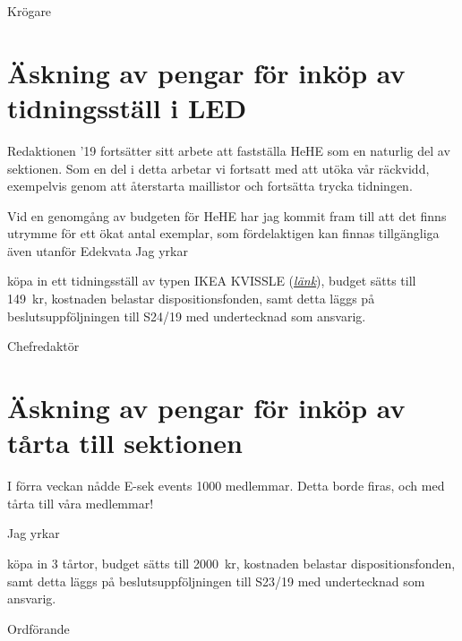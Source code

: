 \documentclass[10pt]{article}
\begin{document}
    \begin{signatures}{1}
    \textit{\ist}
    \signature{Davida Åström}{Krögare}
    \end{signatures}




\newpage

    \section*{Äskning av pengar för inköp av tidningsställ i LED}
    
 	Redaktionen '19 fortsätter sitt arbete att fastställa HeHE som en naturlig del av sektionen. Som en del i detta arbetar vi fortsatt med att utöka vår räckvidd, exempelvis genom att återstarta maillistor och fortsätta trycka tidningen.

Vid en genomgång av budgeten för HeHE har jag kommit fram till att det finns utrymme för ett ökat antal exemplar, som fördelaktigen kan finnas tillgängliga även utanför Edekvata
Jag yrkar 


    \begin{attsatser}
        \att köpa in ett tidningsställ av typen IKEA KVISSLE (\href{https://www.ikea.com/se/sv/p/kvissle-tidningsstaell-foer-vaegg-vit-90198030/}{\textit{länk}}),
        \att budget sätts till \SI{149}{kr},
        \att kostnaden belastar dispositionsfonden, samt
        \att detta läggs på beslutsuppföljningen till S24/19 med undertecknad som ansvarig. 
    \end{attsatser}

    \begin{signatures}{1}
    \textit{\mvh}
    \signature{Emil Eriksson}{Chefredaktör}
    \end{signatures}

\newpage

\section*{Äskning av pengar för inköp av tårta till sektionen}
    
 	I förra veckan nådde E-sek events 1000 medlemmar. Detta borde firas, och med tårta till våra medlemmar!
     
     
     Jag yrkar 


    \begin{attsatser}
        \att köpa in 3 tårtor,
        \att budget sätts till \SI{2000}{kr},
        \att kostnaden belastar dispositionsfonden, samt
        \att detta läggs på beslutsuppföljningen till S23/19 med undertecknad som ansvarig. 
    \end{attsatser}

    \begin{signatures}{1}
    \textit{\ist}
    \signature{Edvard Carlsson}{Ordförande}
    \end{signatures}




   
    
\end{document}
